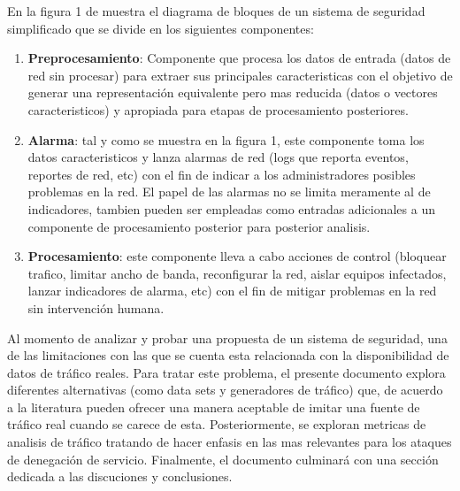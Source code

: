 \documentclass[12pt]{article}
\begin{document}
En la figura 1 de muestra el diagrama de bloques  de un sistema de seguridad simplificado que se divide en los siguientes componentes:
\begin{enumerate}
\item \textbf{Preprocesamiento}: Componente que procesa los datos de entrada (datos de red sin procesar) para extraer sus principales caracteristicas con el objetivo de generar una representación equivalente pero mas reducida (datos o vectores caracteristicos) y apropiada para etapas de procesamiento posteriores.
\item \textbf{Alarma}: tal y como se muestra en la figura 1, este componente toma los datos caracteristicos y lanza alarmas de red (logs que reporta eventos, reportes de red, etc) con el fin de indicar a los administradores posibles problemas en la red. El papel de las alarmas no se limita meramente al de indicadores, tambien pueden ser empleadas como entradas adicionales a un componente de procesamiento posterior para posterior analisis.
\item \textbf{Procesamiento}:  este componente lleva a cabo acciones de control (bloquear trafico, limitar ancho de banda, reconfigurar la red, aislar equipos infectados, lanzar indicadores de alarma, etc) con el fin de mitigar problemas en la red sin intervención humana.
\end{enumerate}

Al momento de analizar y probar una propuesta de un sistema de seguridad, una de las limitaciones con las que se cuenta esta relacionada con la disponibilidad de datos de tráfico reales. Para tratar este problema, el presente documento explora diferentes alternativas (como data sets y generadores de tráfico) que, de acuerdo a la literatura pueden ofrecer una manera aceptable de imitar una fuente de tráfico real cuando se carece de esta. Posteriormente, se exploran metricas de analisis de tráfico tratando de hacer enfasis en las mas relevantes para los ataques de denegación de servicio. Finalmente, el documento culminará con una sección dedicada a las discuciones y conclusiones.
\end{document}

